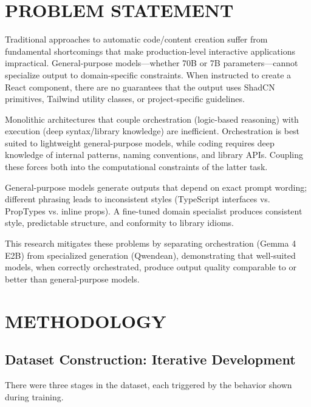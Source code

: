 \documentclass[conference]{IEEEtran}
\begin{document}
\section{PROBLEM STATEMENT}

Traditional approaches to automatic code/content creation suffer from fundamental shortcomings that make production-level interactive applications impractical. General-purpose models—whether 70B or 7B parameters—cannot specialize output to domain-specific constraints. When instructed to create a React component, there are no guarantees that the output uses ShadCN primitives, Tailwind utility classes, or project-specific guidelines.

Monolithic architectures that couple orchestration (logic-based reasoning) with execution (deep syntax/library knowledge) are inefficient. Orchestration is best suited to lightweight general-purpose models, while coding requires deep knowledge of internal patterns, naming conventions, and library APIs. Coupling these forces both into the computational constraints of the latter task.

General-purpose models generate outputs that depend on exact prompt wording; different phrasing leads to inconsistent styles (TypeScript interfaces vs. PropTypes vs. inline props). A fine-tuned domain specialist produces consistent style, predictable structure, and conformity to library idioms.

This research mitigates these problems by separating orchestration (Gemma 4 E2B) from specialized generation (Qwendean), demonstrating that well-suited models, when correctly orchestrated, produce output quality comparable to or better than general-purpose models.

\section{METHODOLOGY}

\subsection{Dataset Construction: Iterative Development}

There were three stages in the dataset, each triggered by the behavior shown during training.
\end{document}
